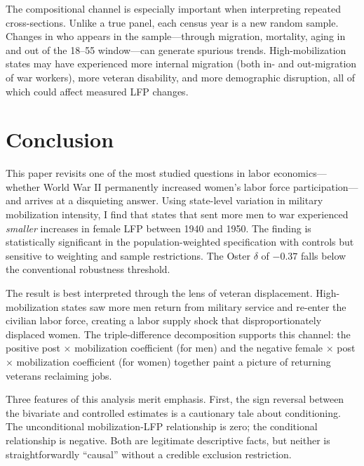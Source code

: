 \documentclass[12pt]{article}
\begin{document}
The compositional channel is especially important when interpreting repeated cross-sections. Unlike a true panel, each census year is a new random sample. Changes in who appears in the sample---through migration, mortality, aging in and out of the 18--55 window---can generate spurious trends. High-mobilization states may have experienced more internal migration (both in- and out-migration of war workers), more veteran disability, and more demographic disruption, all of which could affect measured LFP changes.



\section{Conclusion}
\label{sec:conclusion}

This paper revisits one of the most studied questions in labor economics---whether World War II permanently increased women's labor force participation---and arrives at a disquieting answer. Using state-level variation in military mobilization intensity, I find that states that sent more men to war experienced \textit{smaller} increases in female LFP between 1940 and 1950. The finding is statistically significant in the population-weighted specification with controls but sensitive to weighting and sample restrictions. The Oster $\delta$ of $-0.37$ falls below the conventional robustness threshold.

The result is best interpreted through the lens of veteran displacement. High-mobilization states saw more men return from military service and re-enter the civilian labor force, creating a labor supply shock that disproportionately displaced women. The triple-difference decomposition supports this channel: the positive post $\times$ mobilization coefficient (for men) and the negative female $\times$ post $\times$ mobilization coefficient (for women) together paint a picture of returning veterans reclaiming jobs.

Three features of this analysis merit emphasis. First, the sign reversal between the bivariate and controlled estimates is a cautionary tale about conditioning. The unconditional mobilization-LFP relationship is zero; the conditional relationship is negative. Both are legitimate descriptive facts, but neither is straightforwardly ``causal'' without a credible exclusion restriction.
\end{document}
